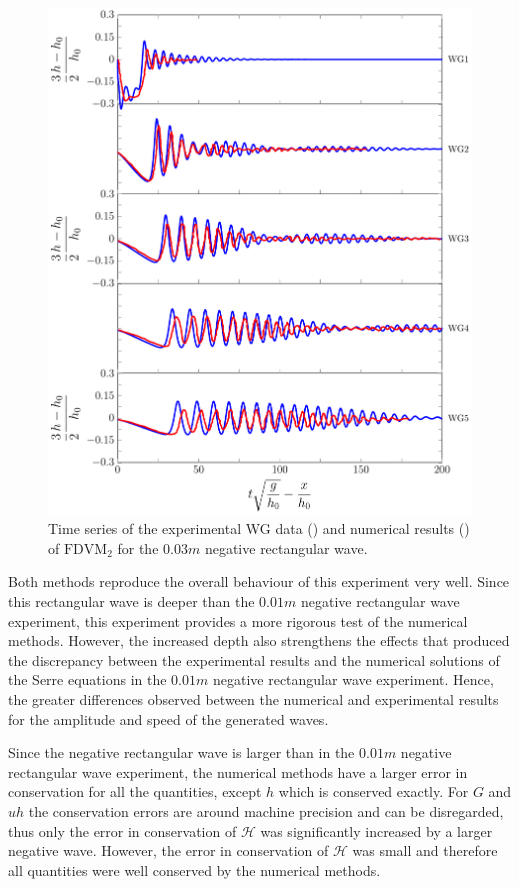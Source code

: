 \begin{figure}
	\centering
	\includegraphics[width=\textwidth]{./chp6/figures/Experiment/Segur/LongWGsFDVM3cm.pdf}
	\caption{Time series of the experimental WG data ({\color{red}\solidrule}) and numerical results ({\color{blue}\solidrule}) of $\text{FDVM}_2$ for the $0.03m$ negative rectangular wave.}
	\label{fig:Segur3cmFDVM}
\end{figure} 

Both methods reproduce the overall behaviour of this experiment very well. Since this rectangular wave is deeper than the $0.01m$ negative rectangular wave experiment, this experiment provides a more rigorous test of the numerical methods. However, the increased depth also strengthens the effects that produced the discrepancy between the experimental results and the numerical solutions of the Serre equations in the $0.01m$ negative rectangular wave experiment. Hence, the greater differences observed between the numerical and experimental results for the amplitude and speed of the generated waves.

Since the negative rectangular wave is larger than in the $0.01m$ negative rectangular wave experiment, the numerical methods have a larger error in conservation for all the quantities, except $h$ which is conserved exactly. For $G$ and $uh$ the conservation errors are around machine precision and can be disregarded, thus only the error in conservation of $\mathcal{H}$ was significantly increased by a larger negative wave. However, the error in conservation of $\mathcal{H}$ was small and therefore all quantities were well conserved by the numerical methods. 

